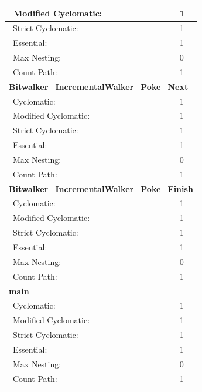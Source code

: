 \begin{longtable}{||p{}|p{}||}
\\\hline
\ Modified Cyclomatic: & 1
\\\hline
\ Strict Cyclomatic: & 1 
\\\hline
\ Essential: & 1
 \\\hline
\ Max Nesting:   & 0
 \\\hline
\ Count Path: & 1
\\\hline
\multicolumn{2}{||l||}{\textbf{Bitwalker\_IncrementalWalker\_Poke\_Next}}
\\\hline
\ Cyclomatic: & 1
\\\hline
\ Modified Cyclomatic: & 1
\\\hline
\ Strict Cyclomatic: & 1 
\\\hline
\ Essential: & 1
 \\\hline
\ Max Nesting:   & 0
 \\\hline
\ Count Path: & 1
\\\hline
\multicolumn{2}{||l||}{\textbf{Bitwalker\_IncrementalWalker\_Poke\_Finish}}
\\\hline
\ Cyclomatic: & 1
\\\hline
\ Modified Cyclomatic: & 1
\\\hline
\ Strict Cyclomatic: & 1 
\\\hline
\ Essential: & 1
 \\\hline
\ Max Nesting:   & 0
 \\\hline
\ Count Path: & 1
\\\hline
\multicolumn{2}{||l||}{\textbf{main}}
\\\hline
\ Cyclomatic: & 1
\\\hline
\ Modified Cyclomatic: & 1
\\\hline
\ Strict Cyclomatic: & 1 
\\\hline
\ Essential: & 1
 \\\hline
\ Max Nesting:   & 0
 \\\hline
\ Count Path: & 1
\\\hline
\end{longtable}

